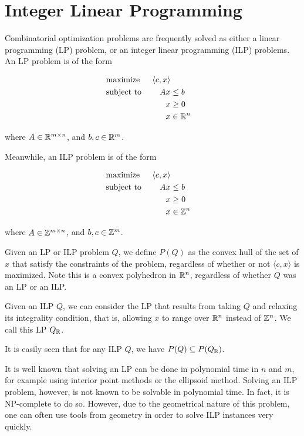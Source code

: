 \section{Integer Linear Programming}
\label{app:ilp}
Combinatorial optimization problems are frequently solved as either a linear programming (LP) problem, or an integer linear programming (ILP) problems. An LP problem is of the form

\begin{align*}
&\text{maximize }  & \langle c, x \rangle\\
&\text{subject to }& Ax &\le b&\\
&                  & x &\ge 0&\\
&                  & x &\in \mathbb{R}^n&
\end{align*}

\noindent where $A \in \mathbb{R}^{m \times n}$, and $b, c \in \mathbb{R}^m$.

Meanwhile, an ILP problem is of the form

\begin{align*}
&\text{maximize }  & \langle c, x \rangle\\
&\text{subject to }& Ax &\le b&\\
&                  & x &\ge 0&\\
&                  & x &\in \mathbb{Z}^n&
\end{align*}

\noindent where $A \in \mathbb{Z}^{m \times n}$, and $b, c \in \mathbb{Z}^m$.

Given an LP or ILP problem $Q$, we define $P(Q)$ as the convex hull of the set of $x$ that satisfy the constraints of the problem, regardless of whether or not $\langle c, x \rangle$ is maximized. Note this is a convex polyhedron in $\mathbb{R}^n$, regardless of whether $Q$ was an LP or an ILP.

Given an ILP $Q$, we can consider the LP that results from taking $Q$ and relaxing its integrality condition, that is, allowing $x$ to range over $\mathbb{R}^n$ instead of $\mathbb{Z}^n$. We call this LP $Q_{\mathbb{R}}$.

It is easily seen that for any ILP $Q$, we have $P(Q) \subseteq P(Q_{\mathbb{R}})$.

It is well known that solving an LP can be done in polynomial time in $n$ and $m$\cite{lp}, for example using interior point methods or the ellipsoid method. Solving an ILP problem, however, is not known to be solvable in polynomial time. In fact, it is NP-complete to do so\cite{Garey:1990:CIG:574848}. However, due to the geometrical nature of this problem, one can often use tools from geometry in order to solve ILP instances very quickly.

